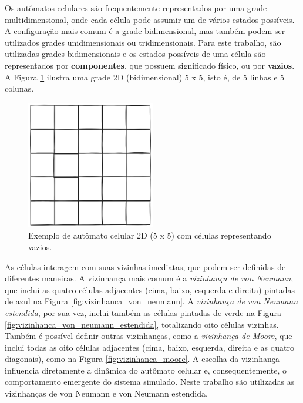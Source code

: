 \documentclass[12pt,oneside]{report}
\begin{document}
Os autômatos celulares são frequentemente representados por uma grade multidimensional, onde cada célula pode assumir um de vários estados possíveis. A configuração mais comum é a grade bidimensional, mas também podem ser utilizados grades unidimensionais ou tridimensionais. Para este trabalho, são utilizadas grades bidimensionais e os estados possíveis de uma célula são representados por \textbf{componentes}, que possuem significado físico, ou por \textbf{vazios}. A Figura \ref{fig:grade_2d} ilustra uma grade 2D (bidimensional) 5 x 5, isto é, de 5 linhas e 5 colunas.

\begin{figure}[H]
    \centering
    \includegraphics[width=0.5\textwidth]{grade_2d.png}
    \caption{\small Exemplo de autômato celular 2D (5 x 5) com células representando vazios.}
    \label{fig:grade_2d}
\end{figure}

As células interagem com suas vizinhas imediatas, que podem ser definidas de diferentes maneiras. A vizinhança mais comum é a \textit{vizinhança de von Neumann}, que inclui as quatro células adjacentes (cima, baixo, esquerda e direita) pintadas de azul na Figura \ref{fig:vizinhanca_von_neumann}. A \textit{vizinhança de von Neumann estendida}, por sua vez, inclui também as células pintadas de verde na Figura \ref{fig:vizinhanca_von_neumann_estendida}, totalizando oito células vizinhas. Também é possível definir outras vizinhanças, como a \textit{vizinhança de Moore}, que inclui todas as oito células adjacentes (cima, baixo, esquerda, direita e as quatro diagonais), como na Figura \ref{fig:vizinhanca_moore}. A escolha da vizinhança influencia diretamente a dinâmica do autômato celular e, consequentemente, o comportamento emergente do sistema simulado. Neste trabalho são utilizadas as vizinhanças de von Neumann e von Neumann estendida.
\end{document}
